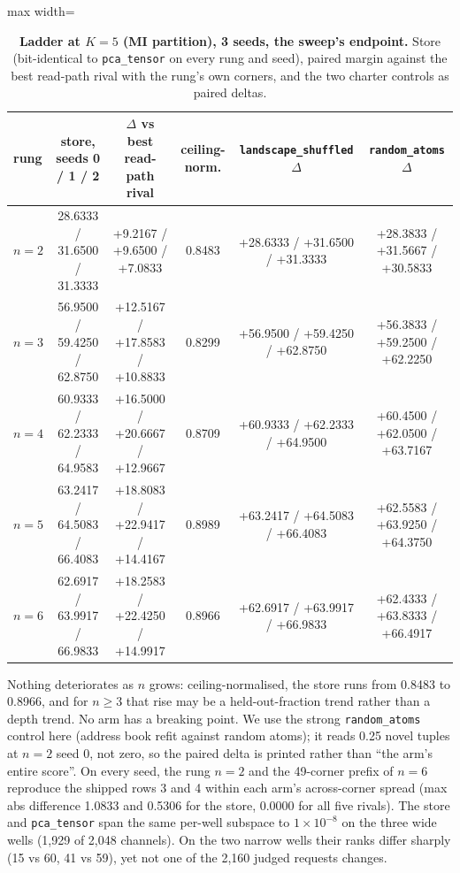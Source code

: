 \documentclass{article} %
\newcommand{\sci}[2]{\ensuremath{#1\times10^{#2}}}
\begin{document}
\begin{table}[h]
\centering\small
\caption{\textbf{Ladder at $K=5$ (MI partition), 3 seeds, the sweep's endpoint.} Store
(bit-identical to \texttt{pca\_tensor} on every rung and seed), paired margin against the best
read-path rival with the rung's own corners, and the two charter controls as paired deltas.}
\label{tab:k5}
\setlength{\tabcolsep}{2.4pt}
\begin{adjustbox}{max width=\linewidth}\begin{tabular}{lccccc}
\toprule
rung & store, seeds 0 / 1 / 2 & $\Delta$ vs best read-path rival & ceiling-norm. & \texttt{landscape\_shuffled} $\Delta$ & \texttt{random\_atoms} $\Delta$ \\
\midrule
$n=2$ & 28.6333 / 31.6500 / 31.3333 & +9.2167 / +9.6500 / +7.0833 & 0.8483 & +28.6333 / +31.6500 / +31.3333 & +28.3833 / +31.5667 / +30.5833 \\
$n=3$ & 56.9500 / 59.4250 / 62.8750 & +12.5167 / +17.8583 / +10.8833 & 0.8299 & +56.9500 / +59.4250 / +62.8750 & +56.3833 / +59.2500 / +62.2250 \\
$n=4$ & 60.9333 / 62.2333 / 64.9583 & +16.5000 / +20.6667 / +12.9667 & 0.8709 & +60.9333 / +62.2333 / +64.9500 & +60.4500 / +62.0500 / +63.7167 \\
$n=5$ & 63.2417 / 64.5083 / 66.4083 & +18.8083 / +22.9417 / +14.4167 & 0.8989 & +63.2417 / +64.5083 / +66.4083 & +62.5583 / +63.9250 / +64.3750 \\
$n=6$ & 62.6917 / 63.9917 / 66.9833 & +18.2583 / +22.4250 / +14.9917 & 0.8966 & +62.6917 / +63.9917 / +66.9833 & +62.4333 / +63.8333 / +66.4917 \\
\bottomrule
\end{tabular}\end{adjustbox}
\end{table}

\noindent Nothing deteriorates as $n$ grows: ceiling-normalised, the store runs from 0.8483 to
0.8966, and for $n\ge3$ that rise may be a held-out-fraction trend rather than a depth trend. No
arm has a breaking point. We use the strong \texttt{random\_atoms} control here (address book
refit against random atoms); it reads 0.25 novel tuples at $n=2$ seed 0, not zero, so the paired
delta is printed rather than ``the arm's entire score''. %
On every seed, the rung $n=2$ and the 49-corner prefix of $n=6$ reproduce the shipped rows 3 and
4 within each arm's across-corner spread (max abs difference 1.0833 and 0.5306 for the store,
0.0000 for all five rivals). %
The store and \texttt{pca\_tensor} span the same per-well subspace to \sci{1}{-8} on the three
wide wells (1,929 of 2,048 channels). On the two narrow wells their ranks differ sharply (15 vs 60,
41 vs 59), yet not one of the 2,160 judged requests changes. %
\end{document}
